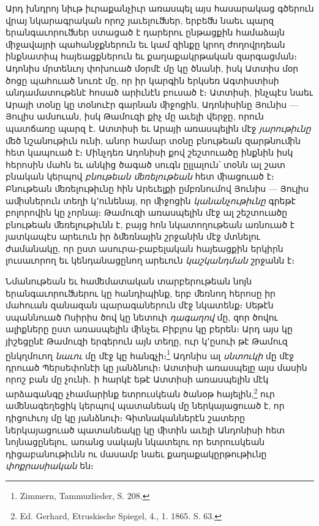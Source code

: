 \documentclass{article}
\begin{document}
{Արդ խնդրոյ նիւթ իւրաքանչիւր առասպել այս հասարակաց գծերուն վրայ նկարագրական որոշ յաւելուﬓեր, երբեﬓ նաեւ պարզ երանգաւորուﬓեր ստացած է դարերու ընթացքին համաձայն ﬕջավայրի պահանջքներուն եւ կամ զինքը կրող ժողովրդեան ինքնատիպ հայեացքներուն եւ քաղաքակրթական զարգացման։ Ադոնիս մրտենւոյ փոխուած մօրմէ մը կը ծնանի, իսկ Ատտիս մօր ծոցը պահուած նուռէ մը, որ իր կարգին երկսեռ Ագտիստիսի անդամատութենէ հոսած արիւնէն բուսած է։ Ատտիսի, ինչպէս նաեւ Արայի տօնը կը տօնուէր գարնան ﬕջոցին, Ադոնիսինը Յունիս — Յուլիս ամսուան, իսկ Թամուզի քիչ մը աւելի վերջը, որուն պատճառը պարզ է․ Ատտիսի եւ Արայի առասպելին մէջ \emph{յարութիւնը} ﬔծ նշանութիւն ունի, անոր համար տօնը բնութեան զարթնուﬕն հետ կապուած է։ Մինչդեռ Ադոնիսի քով շեշտուածը ինքնին իսկ հերոսին մահն եւ անկից ծագած սուգն ըլլալուն՝ տօնն ալ շատ բնական կերպով \emph{բնութեան ﬔռելութեան} հետ ﬕացուած է։ Բնութեան ﬔռելութիւնը հին Արեւելքի ըմբռնումով Յունիս — Յուլիս աﬕսներուն տեղի կ՚ունենայ, որ ﬕջոցին \emph{կանանչութիւնը} գրեթէ բոլորովին կը չորնայ։ Թամուզի առասպելին մէջ ալ շեշտուածը բնութեան ﬔռելութիւնն է, բայց հոն նկատողութեան առնուած է յատկապէս արեւուն իր ձﬔռնային շրջանին մէջ մտնելու ժամանակը, որ ըստ ասուրա֊բաբելական հայեացքին երկիրն լուսաւորող եւ կենդանացընող արեւուն \emph{կաշկանդման} շրջանն է։

Նմանութեան եւ հաﬔմատական տարբերութեան նոյն երանգաւորուﬓերու կը հանդիպինք, երբ ﬔռնող հերոսը իր մահուան զանազան պարագաներուն մէջ նկատենք։ Սեթէն սպաննուած Ոսիրիս ծով կը նետուի \emph{դագաղով} մը, զոր ծովու ալիքները ըստ առասպելին ﬕնչեւ Բիբլոս կը բերեն։ Արդ այս կը յիշեցընէ Թամուզի երգերուն այն տեղը, ուր կ՚ըսուի թէ Թամուզ ընկղմուող \emph{նաւու} մը մէջ կը հանգչի։\footnote{Zimmern, Tammuzlieder, S. 208.} Ադոնիս ալ \emph{սնտուկի} մը մէջ դրուած Պերսեփոնէի կը յանձնուի։ Ատտիսի առասպելը այս մասին որոշ բան մը չունի․ ի հարկէ եթէ Ատտիսի առասպելին մէկ արձագանգը չհամարինք ետրուսկեան ծանօթ հայելին,\footnote{Ed. Gerhard, Etruskische Spiegel, 4., 1. 1865. S. 63.} ուր աﬔնագեղեցիկ կերպով պատանեակ մը ներկայացուած է, որ դիցուհւոյ մը կը յանձնուի։ Գիտնականներէն շատերը ներկայացուած պատանեակը կը ﬕտին աւելի Անդոնիսի հետ նոյնացընելու, առանց սակայն նկատելու որ ետրուսկեան դիցաբանութիւնն ու մասամբ նաեւ քաղաքակըրթութիւնը \emph{փոքրասիական} են։

}
\end{document}
